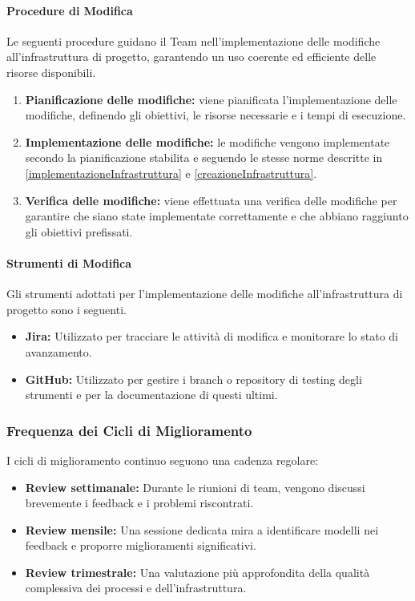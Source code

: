 \documentclass[a4paper,12pt]{article}
\begin{document}
\paragraph{Procedure di Modifica}
Le seguenti procedure guidano il Team nell'implementazione delle modifiche
all'infrastruttura di progetto, garantendo un uso coerente ed efficiente delle
risorse disponibili.
\begin{enumerate}
    \item \textbf{Pianificazione delle modifiche:} viene pianificata l'implementazione delle modifiche, definendo gli obiettivi, le risorse necessarie e i tempi di esecuzione.
    \item \textbf{Implementazione delle modifiche:} le modifiche vengono implementate secondo la pianificazione stabilita e seguendo le stesse norme descritte in \ref{implementazioneInfrastruttura} e \ref{creazioneInfrastruttura}.
    \item \textbf{Verifica delle modifiche:} viene effettuata una verifica delle modifiche per garantire che siano state implementate correttamente e che abbiano raggiunto gli obiettivi prefissati.
\end{enumerate}
\paragraph{Strumenti di Modifica}
Gli strumenti adottati per l'implementazione delle modifiche all'infrastruttura di progetto sono i seguenti.
\begin{itemize}
    \item \textbf{Jira:} Utilizzato per tracciare le attività di modifica e monitorare lo stato di avanzamento.
    \item \textbf{GitHub:} Utilizzato per gestire i branch o repository di testing degli strumenti e per la documentazione di questi ultimi.
\end{itemize}

\subsubsection{Frequenza dei Cicli di Miglioramento}
I cicli di miglioramento continuo seguono una cadenza regolare:
\begin{itemize}
    \item \textbf{Review settimanale:} Durante le riunioni di team, vengono discussi brevemente i feedback e i problemi riscontrati.
    \item \textbf{Review mensile:} Una sessione dedicata mira a identificare modelli nei feedback e proporre miglioramenti significativi.
    \item \textbf{Review trimestrale:} Una valutazione più approfondita della qualità complessiva dei processi e dell'infrastruttura.
\end{itemize}
\end{document}
